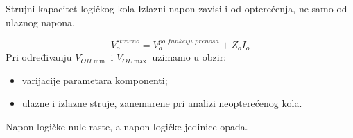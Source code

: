 \begin{frame}[label=08-s026]{Strujni kapacitet logičkog kola}
Izlazni napon zavisi i od opterećenja, ne samo od ulaznog napona.\par\medskip
\[V_o^{stvarno}=V_o^{\textit{po funkciji prenosa}}+Z_o I_o\]
\medskip
Pri određivanju $V_{OH\min}$ i $V_{OL\max}$ uzimamo u obzir:
\begin{itemize}
\item varijacije parametara komponenti;
\item ulazne i izlazne struje, zanemarene pri analizi neopterećenog kola.
\end{itemize}\medskip
\alert{Napon logičke nule raste, a napon logičke jedinice opada.}
\end{frame}
